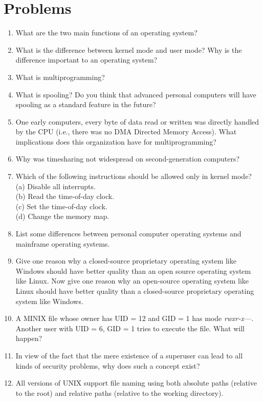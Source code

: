 \documentclass{book}
\newcommand {\sys} [1] {\textsl{#1}}
\begin{document}
\section{Problems}
\begin{enumerate}
\item What are the two main functions of an operating system?
\item What is the difference between kernel mode and user mode? Why is the difference important to an operating system?
\item What is multiprogramming?
\item What is spooling? Do you think that advanced personal computers will have spooling as a standard feature in the future?
\item One early computers, every byte of data read or written was directly handled by the CPU (i.e., there was no DMA Directed Memory Access).
      What implications does this organization have for multiprogramming?
\item Why was timesharing not widespread on second-generation computers?
\item Which of the following instructions should be allowed only in kernel mode?\\
      (a) Disable all interrupts.\\
      (b) Read the time-of-day clock.\\
      (c) Set the time-of-day clock.\\
      (d) Change the memory map.
\item List some differences between personal computer operating systems and mainframe operating systems.
\item Give one reason why a closed-source proprietary operating system like Windows should have better quality than 
      an open source operating system like Linux.
      Now give one reason why an open-source operating system like Linux should have better quality than 
      a closed-source proprietary operating system like Windows.
\item A MINIX file whose owner has UID = 12 and GID = 1 has mode \sys{rwxr-x---}.
      Another user with UID = 6, GID = 1 tries to execute the file. What will happen?
\item In view of the fact that the mere existence of a superuser can lead to all kinds of security problems, why does such a concept exist?
\item All versions of UNIX support file naming using both absolute paths (relative to the root) and 
      relative paths (relative to the working directory). 

\end{enumerate}
\end{document}
